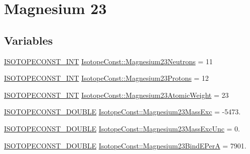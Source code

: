 \hypertarget{group___isotope_const-_magnesium-_mg23}{}\section{Magnesium 23}
\label{group___isotope_const-_magnesium-_mg23}
\subsection*{Variables}
\begin{DoxyCompactItemize}
\item 
\mbox{\hyperlink{group___isotope_const-_macros_ga5f18360b3e99483a35c32d789e62621c}{I\+S\+O\+T\+O\+P\+E\+C\+O\+N\+S\+T\+\_\+\+I\+NT}} \mbox{\hyperlink{group___isotope_const-_magnesium-_mg23_gae18c6ee9223e775f813de9bd58e4506d}{Isotope\+Const\+::\+Magnesium23\+Neutrons}} = 11
\item 
\mbox{\hyperlink{group___isotope_const-_macros_ga5f18360b3e99483a35c32d789e62621c}{I\+S\+O\+T\+O\+P\+E\+C\+O\+N\+S\+T\+\_\+\+I\+NT}} \mbox{\hyperlink{group___isotope_const-_magnesium-_mg23_gac177d9888eddcdbb573321fae8de81c4}{Isotope\+Const\+::\+Magnesium23\+Protons}} = 12
\item 
\mbox{\hyperlink{group___isotope_const-_macros_ga5f18360b3e99483a35c32d789e62621c}{I\+S\+O\+T\+O\+P\+E\+C\+O\+N\+S\+T\+\_\+\+I\+NT}} \mbox{\hyperlink{group___isotope_const-_magnesium-_mg23_ga86e8404440e37eee2c126fb3e973524d}{Isotope\+Const\+::\+Magnesium23\+Atomic\+Weight}} = 23
\item 
\mbox{\hyperlink{group___isotope_const-_macros_ga8f45a7272ce02c0b4c65c44636ed719a}{I\+S\+O\+T\+O\+P\+E\+C\+O\+N\+S\+T\+\_\+\+D\+O\+U\+B\+LE}} \mbox{\hyperlink{group___isotope_const-_magnesium-_mg23_ga4c7d55a68c5e1192697ce97dcf29f846}{Isotope\+Const\+::\+Magnesium23\+Mass\+Exc}} = -\/5473.
\item 
\mbox{\hyperlink{group___isotope_const-_macros_ga8f45a7272ce02c0b4c65c44636ed719a}{I\+S\+O\+T\+O\+P\+E\+C\+O\+N\+S\+T\+\_\+\+D\+O\+U\+B\+LE}} \mbox{\hyperlink{group___isotope_const-_magnesium-_mg23_ga9aca9a5b85f293ea33d2dd6dd9beebd9}{Isotope\+Const\+::\+Magnesium23\+Mass\+Exc\+Unc}} = 0.
\item 
\mbox{\hyperlink{group___isotope_const-_macros_ga8f45a7272ce02c0b4c65c44636ed719a}{I\+S\+O\+T\+O\+P\+E\+C\+O\+N\+S\+T\+\_\+\+D\+O\+U\+B\+LE}} \mbox{\hyperlink{group___isotope_const-_magnesium-_mg23_ga6185e17453ebb7ab6f5493d4531df59e}{Isotope\+Const\+::\+Magnesium23\+Bind\+E\+PerA}} = 7901.
\item 

\end{DoxyCompactItemize}
